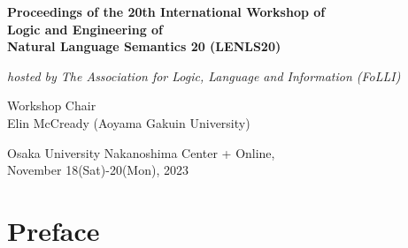 \documentclass[12pt]{jarticle}
\begin{document}
\pagestyle{empty}

\vspace*{1cm}
\begin{Large}
\begin{center}
{\bf Proceedings of the 20th International Workshop of \\
     Logic and Engineering of \\Natural Language Semantics 20 (LENLS20)}
\end{center}
\end{Large}
\vspace*{1cm}
\begin{Large}
\begin{center}
{\em hosted by The Association for Logic, Language and Information (FoLLI)}
\end{center}
\end{Large}
\begin{large}
\vspace*{1cm}
\begin{center}
Workshop Chair\\ $\;$\\
Elin McCready (Aoyama Gakuin University)
\end{center}
\end{large}
\vspace*{3cm}
\vspace*{1cm}
\begin{large}
\begin{center}
Osaka University Nakanoshima Center + Online, \\
November 18(Sat)-20(Mon), 2023
\end{center}
\end{large}
\vfill

\newpage

\vspace*{20cm}
\vfill
\begin{large}

\end{large}

\newpage
\pagestyle{plain}

\newpage
\section*{Preface}
\end{document}
